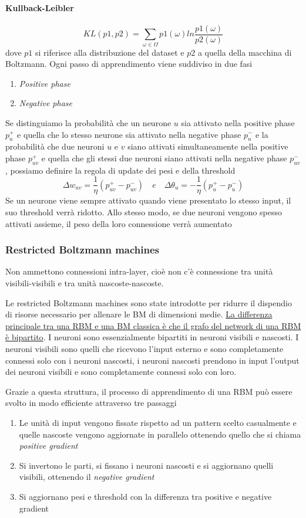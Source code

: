 \paragraph{Kullback-Leibler}
$$KL(p1,p2) = \sum_{\omega \in \Omega} p1(\omega) ln\frac{p1(\omega)}{p2(\omega)}$$
dove $p1$ si riferisce alla distribuzione del dataset e $p2$ a quella della macchina di Boltzmann. Ogni passo di apprendimento viene suddiviso in due fasi
\begin{enumerate}
    \item \textit{Positive phase}
    \item \textit{Negative phase}
\end{enumerate}
Se distinguiamo la probabilità che un neurone $u$ sia attivato nella positive phase $p_u^{+}$ e quella che lo stesso neurone sia attivato nella negative phase $p_u^{-}$ e la probabilità che due neuroni $u$ e $v$ siano attivati simultaneamente nella positive phase $p_{uv}^{+}$ e quella che gli stessi due neuroni siano attivati nella negative phase $p_{uv}^{-}$, possiamo definire la regola di update dei pesi e della threshold
$$\Delta w_{uv} = \frac{1}{\eta} (p_{uv}^{+} - p_{uv}^{-}) \quad \mathit{e}\quad\Delta \theta_u = -\frac{1}{\eta}(p_u^{+} - p_u^{-})$$
Se un neurone viene sempre attivato quando viene presentato lo stesso input, il suo threshold verrà ridotto. Allo stesso modo, se due neuroni vengono spesso attivati assieme, il peso della loro connessione verrà aumentato 

\subsubsection{Restricted Boltzmann machines}
Non ammettono connessioni intra-layer, cioè non c'è connessione tra unità visibili-visibili e tra unità nascoste-nascoste.

Le restricted Boltzmann machines sono state introdotte per ridurre il dispendio di risorse necessario per allenare le BM di dimensioni medie. \uline{La differenza principale tra una RBM e una BM classica è che il grafo del network di una RBM è bipartito}. I neuroni sono essenzialmente bipartiti in neuroni visibili e nascosti. I neuroni visibili sono quelli che ricevono l'input esterno e sono completamente connessi solo con i neuroni nascosti, i neuroni nascosti prendono in input l'output dei neuroni visibili e sono completamente connessi solo con loro. 

Grazie a questa struttura, il processo di apprendimento di una RBM può essere svolto in modo efficiente attraverso tre passaggi
\begin{enumerate}
    \item Le unità di input vengono fissate rispetto ad un pattern scelto casualmente e quelle nascoste vengono aggiornate in parallelo ottenendo quello che si chiama \textit{positive gradient}
    \item Si invertono le parti, si fissano i neuroni nascosti e si aggiornano quelli visibili, ottenendo il \textit{negative gradient}
    \item Si aggiornano pesi e threshold con la differenza tra positive e negative gradient
\end{enumerate}

